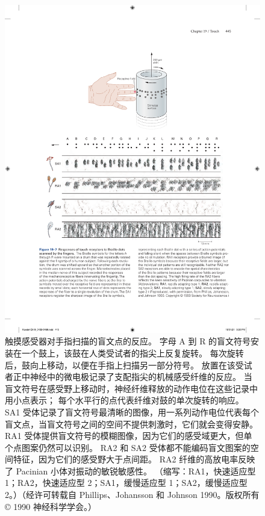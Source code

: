 \begin{figure}[htbp]
	\centering
	\includegraphics[width=1.0\linewidth]{chap19/fig_19_7}
	\caption{触摸感受器对手指扫描的盲文点的反应。
		字母 A 到 R 的盲文符号安装在一个鼓上，该鼓在人类受试者的指尖上反复旋转。
		每次旋转后，鼓向上移动，以便在手指上扫描另一部分符号。
		放置在该受试者正中神经中的微电极记录了支配指尖的机械感受纤维的反应。
		当盲文符号在感受野上移动时，神经纤维释放的动作电位在这些记录中用小点表示； 每个水平行的点代表纤维对鼓的单次旋转的响应。
		SA1 受体记录了盲文符号最清晰的图像，用一系列动作电位代表每个盲文点，当盲文符号之间的空间不提供刺激时，它们就会变得安静。
		RA1 受体提供盲文符号的模糊图像，因为它们的感受域更大，但单个点图案仍然可以识别。 
		RA2 和 SA2 受体都不能编码盲文图案的空间特征，因为它们的感受野大于点间距。
		RA2 纤维的高放电率反映了 Pacinian 小体对振动的敏锐敏感性。 （缩写：RA1，快速适应型 1；RA2，快速适应型 2；SA1，缓慢适应型 1；SA2，缓慢适应型 2。）（经许可转载自 Phillips、Johansson 和 Johnson 1990。版权所有 © 1990 神经科学学会。）}
	\label{fig:19_7}
\end{figure}


